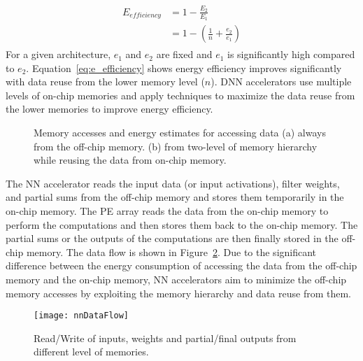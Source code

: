 \begin{align}\label{eq:e_efficiency}
	\begin{split}
	E_{efficiency}&=1-\frac{E_2}{E_1}\\
	&=1-(\frac{1}{n}+\frac{e_{2}}{e_{1}})
	\end{split}
\end{align}
For a given architecture, $e_{1}$ and $e_{2}$ are fixed and $e_1$ is significantly high compared to $e_2$. Equation~\ref{eq:e_efficiency} shows energy efficiency improves significantly with data reuse from the lower memory level ($n$). DNN accelerators use multiple levels of on-chip memories and apply techniques to maximize the data reuse from the lower memories to improve energy efficiency. 
\begin{figure}[!htb]
	\centering
	\captionsetup{font=sf}
	\hfil	
	\hfil	
	\caption{Memory accesses and energy estimates for accessing data (a) always from the off-chip memory. (b) from two-level of memory hierarchy while reusing the data from on-chip memory.}
	\label{fig:memsAccess}
\end{figure}

The NN accelerator reads the input data (or input activations), filter weights, and partial sums from the off-chip memory and stores them temporarily in the on-chip memory. The PE array reads the data from the on-chip memory to perform the computations and then stores them back to the on-chip memory. The partial sums or the outputs of the computations are then finally stored in the off-chip memory. The data flow is shown in Figure~\ref{fig:nnDataFlow}. Due to the significant difference between the energy consumption of accessing the data from the off-chip memory and the on-chip memory, NN accelerators aim to minimize the off-chip memory accesses by exploiting the memory hierarchy and data reuse from them.
\begin{figure}[!htb]
	\centering
	\captionsetup{font=sf}	
	\texttt{[image: nnDataFlow]}
	\caption{Read/Write of inputs, weights and partial/final outputs from different level of memories.}
	\label{fig:nnDataFlow}
\end{figure}


